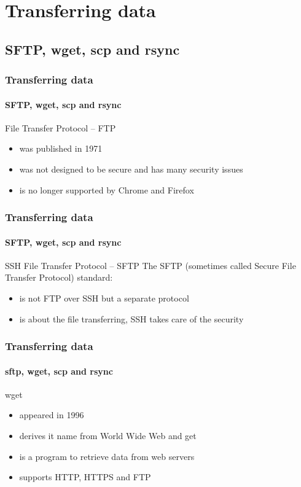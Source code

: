 \documentclass[aspectratio=169,usenames,dvipsnames]{beamer}
\begin{document}
\section{Transferring data}
    \subsection{SFTP, wget, scp and rsync}
    \begin{frame}
        \frametitle{Transferring data}
        \framesubtitle{SFTP, wget, scp and rsync}
        \begin{block}{File Transfer Protocol -- FTP}
        \begin{itemize}
            \item was \alert{published in 1971}
            \item was not designed to be secure and has \alert{many security issues}
            \item is \alert{no longer supported by Chrome and Firefox} 
        \end{itemize}
        \end{block}
    \end{frame}
    \begin{frame}
        \frametitle{Transferring data}
        \framesubtitle{SFTP, wget, scp and rsync}
        \begin{block}{SSH File Transfer Protocol -- SFTP}
        The SFTP (sometimes called Secure File Transfer Protocol) standard:
        \begin{itemize}
            \item is not FTP over SSH but a separate protocol
            \item is about the file transferring, SSH takes care of the security 
        \end{itemize}
        \end{block}
    \end{frame}
    \begin{frame}
        \frametitle{Transferring data}
        \framesubtitle{sftp, wget, scp and rsync}
        \begin{block}{wget}
            \begin{itemize}
                \item appeared in 1996
                \item derives it name from World Wide Web and get
                \item is a program to retrieve data from web servers
                \item supports HTTP, HTTPS and FTP
            \end{itemize}
        \end{block}
    \end{frame}
\end{document}
